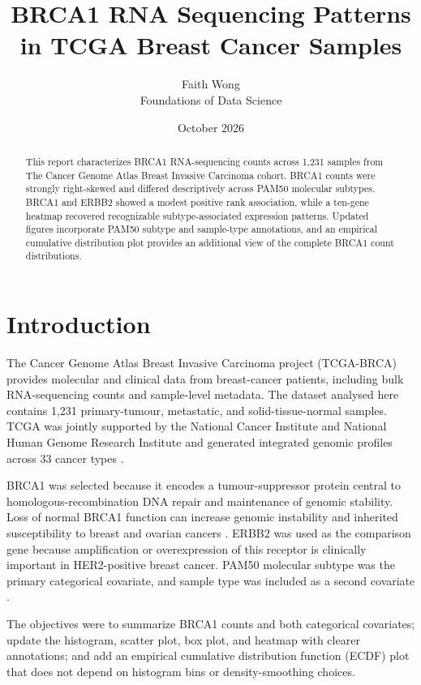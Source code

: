 \documentclass[11pt]{article}
\title{\textbf{BRCA1 RNA Sequencing Patterns in TCGA Breast Cancer Samples}}
\author{Faith Wong\\Foundations of Data Science}
\date{October 2026}
\begin{document}
\maketitle

\begin{abstract}
This report characterizes BRCA1 RNA-sequencing counts across 1,231 samples from The Cancer Genome Atlas Breast Invasive Carcinoma cohort. BRCA1 counts were strongly right-skewed and differed descriptively across PAM50 molecular subtypes. BRCA1 and ERBB2 showed a modest positive rank association, while a ten-gene heatmap recovered recognizable subtype-associated expression patterns. Updated figures incorporate PAM50 subtype and sample-type annotations, and an empirical cumulative distribution plot provides an additional view of the complete BRCA1 count distributions.
\end{abstract}

\tableofcontents
\newpage

\section{Introduction}

The Cancer Genome Atlas Breast Invasive Carcinoma project (TCGA-BRCA) provides molecular and clinical data from breast-cancer patients, including bulk RNA-sequencing counts and sample-level metadata. The dataset analysed here contains 1,231 primary-tumour, metastatic, and solid-tissue-normal samples. TCGA was jointly supported by the National Cancer Institute and National Human Genome Research Institute and generated integrated genomic profiles across 33 cancer types \cite{nci_tcga,tcga2012}.

BRCA1 was selected because it encodes a tumour-suppressor protein central to homologous-recombination DNA repair and maintenance of genomic stability. Loss of normal BRCA1 function can increase genomic instability and inherited susceptibility to breast and ovarian cancers \cite{roy2012}. ERBB2 was used as the comparison gene because amplification or overexpression of this receptor is clinically important in HER2-positive breast cancer. PAM50 molecular subtype was the primary categorical covariate, and sample type was included as a second covariate \cite{parker2009}.

The objectives were to summarize BRCA1 counts and both categorical covariates; update the histogram, scatter plot, box plot, and heatmap with clearer annotations; and add an empirical cumulative distribution function (ECDF) plot that does not depend on histogram bins or density-smoothing choices.
\end{document}
